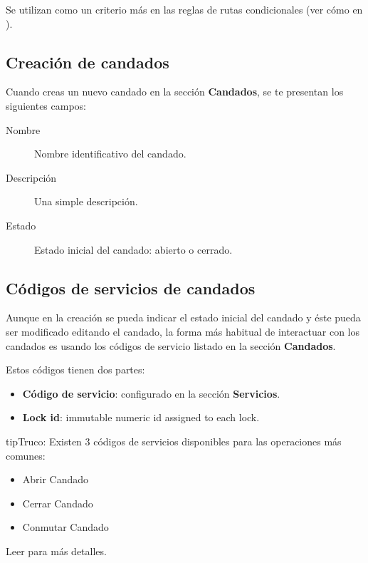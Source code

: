 \documentclass[letterpaper,10pt,spanish]{sphinxmanual}
\begin{document}
Se utilizan como un criterio más en las reglas de rutas condicionales (ver cómo en {\hyperref[pbx_features/conditional_routes:conditional\string-routes]{}}).


\subsection{Creación de candados}
\label{pbx_features/route_locks:route-lock-creation}
Cuando creas un nuevo candado en la sección \textbf{Candados}, se te presentan los siguientes campos:
\begin{description}
\item[{Nombre}] \leavevmode{}\label{pbx_features/route_locks:term-name}
Nombre identificativo del candado.

\item[{Descripción}] \leavevmode{}\label{pbx_features/route_locks:term-description}
Una simple descripción.

\item[{Estado}] \leavevmode{}\label{pbx_features/route_locks:term-status}
Estado inicial del candado: abierto o cerrado.

\end{description}


\subsection{Códigos de servicios de candados}
\label{pbx_features/route_locks:route-locks-service-codes}
Aunque en la creación se pueda indicar el estado inicial del candado y éste pueda ser modificado editando el candado, la forma más habitual de interactuar con los candados es usando los códigos de servicio listado en la sección \textbf{Candados}.

Estos códigos tienen dos partes:
\begin{itemize}
\item {} 
\textbf{Código de servicio}: configurado en la sección \textbf{Servicios}.

\item {} 
\textbf{Lock id}: immutable numeric id assigned to each lock.

\end{itemize}

\begin{notice}{tip}{Truco:}
Existen 3 códigos de servicios disponibles para las operaciones más comunes:
\begin{itemize}
\item {} 
Abrir Candado

\item {} 
Cerrar Candado

\item {} 
Conmutar Candado

\end{itemize}

Leer {\hyperref[pbx_features/services:services]{}} para más detalles.
\end{notice}
\end{document}
